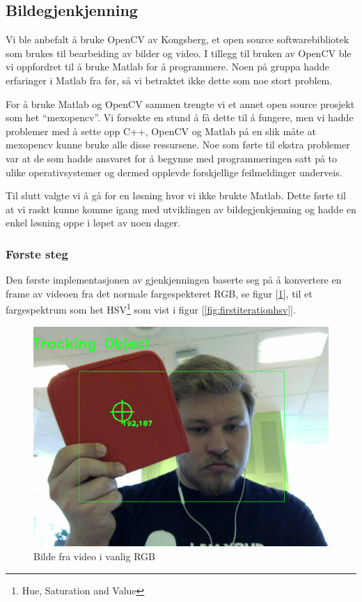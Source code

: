 \subsection{Bildegjenkjenning}

Vi ble anbefalt å bruke OpenCV av Kongsberg, et open source softwarebibliotek som brukes til bearbeiding av bilder og video. I tillegg til bruken av OpenCV ble vi oppfordret til å bruke Matlab for å programmere. Noen på gruppa hadde erfaringer i Matlab fra før, så vi betraktet ikke dette som noe stort problem.

For å bruke Matlab og OpenCV sammen trengte vi et annet open source prosjekt som het ``mexopencv''. Vi forsøkte en stund å få dette til å fungere, men vi hadde problemer med å sette opp C++, OpenCV og Matlab på en slik måte at mexopencv kunne bruke alle disse ressursene. Noe som førte til ekstra problemer var at de som hadde ansvaret for å begynne med programmeringen satt på to ulike operativsystemer og dermed opplevde forskjellige feilmeldinger underveis. 

Til slutt valgte vi å gå for en løsning hvor vi ikke brukte Matlab. Dette førte til at vi raskt kunne komme igang med utviklingen av bildegjenkjenning og hadde en enkel løsning oppe i løpet av noen dager.

\subsubsection{Første steg}

Den første implementasjonen av gjenkjenningen baserte seg på å konvertere en frame av videoen fra det normale fargespekteret RGB, se figur [\ref{fig:firstiterationrgb}], til et fargespektrum som het HSV\footnote{Hue, Saturation and Value} som vist i figur [\ref{fig:firstiterationhsv}].

\begin{figure}[h!]
	\centering
	\includegraphics[scale=0.45]{img/first-rgb.jpg}
	\caption[Første iterasjon RGB bilde]{Bilde fra video i vanlig RGB}
	\label{fig:firstiterationrgb}
\end{figure}

